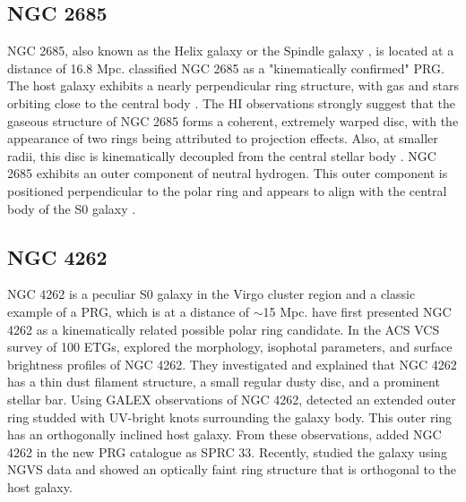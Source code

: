 \documentclass{pas}
\begin{document}
\subsection{NGC 2685}
NGC 2685, also known as the Helix galaxy or the Spindle galaxy \citep{1961Sandage}, is located at a distance of 16.8 Mpc. \cite{whitmore1990} classified NGC 2685 as a "kinematically confirmed" PRG. The host galaxy exhibits a nearly perpendicular ring structure, with gas and stars orbiting close to the central body \citep{1997Eskridge2685,1998chenko2685}. 
The HI observations strongly suggest that the gaseous structure of NGC 2685 forms a coherent, extremely warped disc, with the appearance of two rings being attributed to projection effects. Also, at smaller radii, this disc is kinematically decoupled from the central stellar body  \citep{2009Jozsa}. NGC 2685 exhibits an outer component of neutral hydrogen. This outer component is positioned perpendicular to the polar ring and appears to align with the central body of the S0 galaxy \citep{2005Hagen2685,2009Jozsa}.

\subsection{NGC 4262}
NGC 4262 is a peculiar S0 galaxy in the Virgo cluster region and a classic example of a PRG, which is at a distance of $\sim$15 Mpc. \cite{whitmore1990} have first presented NGC 4262 as a kinematically related possible polar ring candidate. In the ACS VCS survey of 100 ETGs, \cite{Ferrarese2006} explored the morphology, isophotal parameters, and surface brightness profiles of NGC 4262. They investigated and explained that NGC 4262 has a thin dust filament structure, a small regular dusty disc, and a prominent stellar bar. Using GALEX observations of NGC 4262, \cite{Buson2011} detected an extended outer ring studded with UV-bright knots surrounding the galaxy body. This outer ring has an orthogonally inclined host galaxy. From these observations, \cite{moiseev2011MNRAS.418..244M}  added NGC 4262 in the new PRG catalogue as SPRC 33. Recently, \cite{2024akr_2} studied the galaxy using NGVS data and showed an optically faint ring structure that is orthogonal to the host galaxy. 
\end{document}
